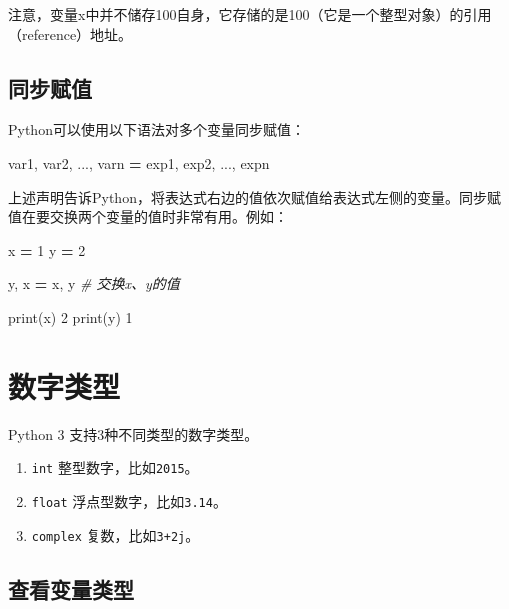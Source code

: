 \documentclass[]{ctexbook}
\newenvironment{Shaded}{\begin{snugshade}}{\end{snugshade}}
\newcommand{\BuiltInTok}[1]{#1}
\newcommand{\CommentTok}[1]{\textcolor[rgb]{0.56,0.35,0.01}{\textit{#1}}}
\newcommand{\DecValTok}[1]{\textcolor[rgb]{0.00,0.00,0.81}{#1}}
\newcommand{\NormalTok}[1]{#1}
\newcommand{\OperatorTok}[1]{\textcolor[rgb]{0.81,0.36,0.00}{\textbf{#1}}}
\providecommand{\tightlist}{%
  \setlength{\itemsep}{0pt}\setlength{\parskip}{0pt}}
\begin{document}
注意，变量x中并不储存100自身，它存储的是100（它是一个整型对象）的引用（reference）地址。

\hypertarget{ux540cux6b65ux8d4bux503c}{%
\subsection{同步赋值}\label{ux540cux6b65ux8d4bux503c}}

Python可以使用以下语法对多个变量同步赋值：

\begin{Shaded}
\begin{Highlighting}[]
\NormalTok{var1, var2, ..., varn }\OperatorTok{=}\NormalTok{ exp1, exp2, ..., expn}
\end{Highlighting}
\end{Shaded}

上述声明告诉Python，将表达式右边的值依次赋值给表达式左侧的变量。同步赋值在要交换两个变量的值时非常有用。例如：

\begin{Shaded}
\begin{Highlighting}[]
\NormalTok{x }\OperatorTok{=} \DecValTok{1}
\NormalTok{y }\OperatorTok{=} \DecValTok{2}

\NormalTok{y, x }\OperatorTok{=}\NormalTok{ x, y }\CommentTok{# 交换x、y的值}

\BuiltInTok{print}\NormalTok{(x)}
\DecValTok{2}
\BuiltInTok{print}\NormalTok{(y)}
\DecValTok{1}
\end{Highlighting}
\end{Shaded}

\hypertarget{ux6570ux5b57ux7c7bux578b}{%
\section{数字类型}\label{ux6570ux5b57ux7c7bux578b}}

Python 3 支持3种不同类型的数字类型。

\begin{enumerate}
\def\labelenumi{\arabic{enumi}.}
\tightlist
\item
  \texttt{int} 整型数字，比如\texttt{2015}。
\item
  \texttt{float} 浮点型数字，比如\texttt{3.14}。
\item
  \texttt{complex} 复数，比如\texttt{3+2j}。
\end{enumerate}

\hypertarget{ux67e5ux770bux53d8ux91cfux7c7bux578b}{%
\subsection{查看变量类型}\label{ux67e5ux770bux53d8ux91cfux7c7bux578b}}
\end{document}

